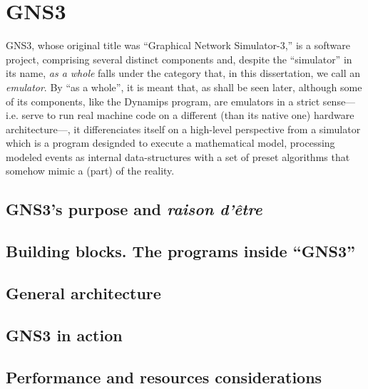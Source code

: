 
\chapter{GNS3}
\label{ch:gns3}

GNS3, whose original title was ``Graphical Network Simulator-3,'' is a software project, comprising several distinct components and, despite the ``simulator'' in its name, \emph{as a whole} falls under the category that, in this dissertation, we call an \emph{emulator}.
By ``as a whole'', it is meant that, as shall be seen later, although some of its components, like the Dynamips program, are emulators in a strict sense---i.e. serve to run real machine code on a different (than its native one) hardware architecture---, it differenciates itself on a high-level perspective from a simulator which is a program designded to execute a mathematical model, processing modeled events as internal data-structures with a set of preset algorithms that somehow mimic a (part) of the reality.


\section{GNS3's purpose and \emph{raison d'être}}
\label{sec:gns3why}


\section{Building blocks. The programs inside ``GNS3''}
\label{sec:gns3buildingblocks}


\section{General architecture}
\label{sec:gns3architecture}


\section{GNS3 in action}
\label{sec:gns3inaction}


\section{Performance and resources considerations}
\label{sec:gns3performance}


